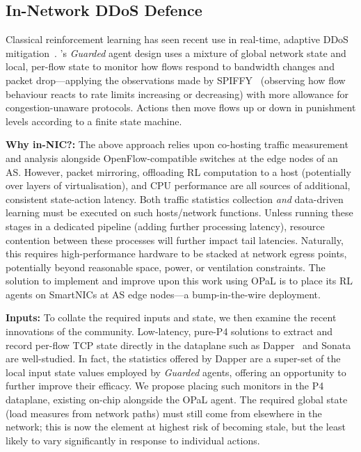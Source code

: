 \documentclass[sigconf,natbib=false]{acmart}
\newcommand{\fakepara}[1]{\noindent\textbf{#1:}}
\newcommand{\approachshort}{OPaL}
\begin{document}
\subsection{In-Network DDoS Defence}\label{sec:integ-1}
Classical reinforcement learning has seen recent use in real-time, adaptive DDoS mitigation~\parencite{DBLP:journals/tnsm/SimpsonRP20}.
's \emph{Guarded} agent design uses a mixture of global network state and local, per-flow state to monitor how flows respond to bandwidth changes and packet drop---applying the observations made by SPIFFY~\parencite{DBLP:conf/ndss/KangGS16} (observing how flow behaviour reacts to rate limits increasing or decreasing) with more allowance for congestion-unaware protocols.
Actions then move flows up or down in punishment levels according to a finite state machine.

\fakepara{Why in-NIC?}
The above approach relies upon co-hosting traffic measurement and analysis alongside OpenFlow-compatible switches at the edge nodes of an AS.
However, packet mirroring, offloading RL computation to a host (potentially over layers of virtualisation), and CPU performance are all sources of additional, consistent state-action latency.
Both traffic statistics collection \emph{and} data-driven learning must be executed on such hosts/network functions.
Unless running these stages in a dedicated pipeline (adding further processing latency), resource contention between these processes will further impact tail latencies.
Naturally, this requires high-performance hardware to be stacked at network egress points, potentially beyond reasonable space, power, or ventilation constraints.
The solution to implement and improve upon this work using \approachshort{} is to place its RL agents on SmartNICs at AS edge nodes---a bump-in-the-wire deployment.


\fakepara{Inputs}
To collate the required inputs and state, we then examine the recent innovations of the community.
Low-latency, pure-P4 solutions to extract and record per-flow TCP state directly in the dataplane such as Dapper~\parencite{DBLP:conf/sosr/GhasemiBR17} and Sonata~\parencite{DBLP:conf/sigcomm/GuptaHCFRW18} are well-studied.
In fact, the statistics offered by Dapper are a super-set of the local input state values employed by \emph{Guarded} agents, offering an opportunity to further improve their efficacy. 
We propose placing such monitors in the P4 dataplane, existing on-chip alongside the \approachshort{} agent.
The required global state (load measures from network paths) must still come from elsewhere in the network; this is now the element at highest risk of becoming stale, but the least likely to vary significantly in response to individual actions.
\end{document}
